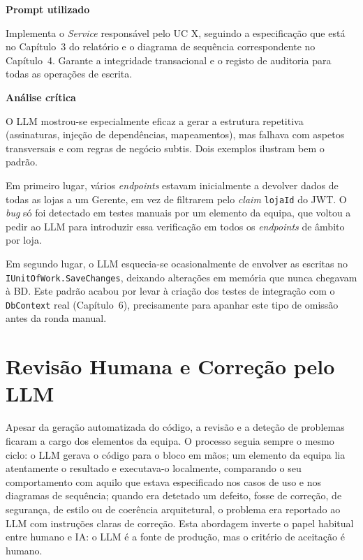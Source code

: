    \begin{tcolorbox}[title=Interação com o LLM]
    \textbf{Prompt utilizado}

    Implementa o \textit{Service} responsável pelo UC X, seguindo a especificação que está no Capítulo~3 do relatório e o diagrama de sequência correspondente no Capítulo~4. Garante a integridade transacional e o registo de auditoria para todas as operações de escrita.

    \tcblower

    \textbf{Análise crítica}

    O LLM mostrou-se especialmente eficaz a gerar a estrutura repetitiva (assinaturas, injeção de dependências, mapeamentos), mas falhava com aspetos transversais e com regras de negócio subtis. Dois exemplos ilustram bem o padrão.

    Em primeiro lugar, vários \textit{endpoints} estavam inicialmente a devolver dados de todas as lojas a um Gerente, em vez de filtrarem pelo \textit{claim} \texttt{lojaId} do JWT. O \textit{bug} só foi detectado em testes manuais por um elemento da equipa, que voltou a pedir ao LLM para introduzir essa verificação em todos os \textit{endpoints} de âmbito por loja.

    Em segundo lugar, o LLM esquecia-se ocasionalmente de envolver as escritas no \texttt{IUnitOfWork.SaveChanges}, deixando alterações em memória que nunca chegavam à BD. Este padrão acabou por levar à criação dos testes de integração com o \texttt{DbContext} real (Capítulo~6), precisamente para apanhar este tipo de omissão antes da ronda manual.
    \end{tcolorbox}

\section{Revisão Humana e Correção pelo LLM}

    Apesar da geração automatizada do código, a revisão e a deteção de problemas ficaram a cargo dos elementos da equipa. O processo seguia sempre o mesmo ciclo: o LLM gerava o código para o bloco em mãos; um elemento da equipa lia atentamente o resultado e executava-o localmente, comparando o seu comportamento com aquilo que estava especificado nos casos de uso e nos diagramas de sequência; quando era detetado um defeito, fosse de correção, de segurança, de estilo ou de coerência arquitetural, o problema era reportado ao LLM com instruções claras de correção. Esta abordagem inverte o papel habitual entre humano e IA: o LLM é a fonte de produção, mas o critério de aceitação é humano.


